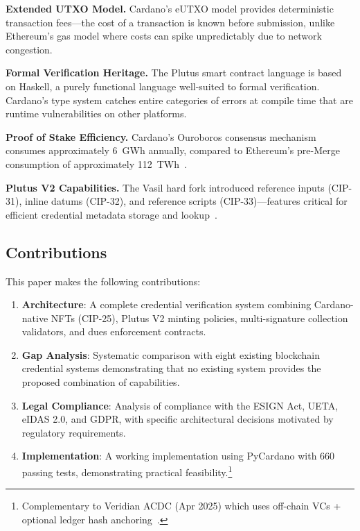 \documentclass[conference,10pt]{IEEEtran}
\begin{document}
\textbf{Extended UTXO Model.} Cardano's eUTXO model provides deterministic transaction fees---the cost of a transaction is known before submission, unlike Ethereum's gas model where costs can spike unpredictably due to network congestion.

\textbf{Formal Verification Heritage.} The Plutus smart contract language is based on Haskell, a purely functional language well-suited to formal verification. Cardano's type system catches entire categories of errors at compile time that are runtime vulnerabilities on other platforms.

\textbf{Proof of Stake Efficiency.} Cardano's Ouroboros consensus mechanism consumes approximately 6~GWh annually, compared to Ethereum's pre-Merge consumption of approximately 112~TWh~\cite{kiayias2017}.

\textbf{Plutus V2 Capabilities.} The Vasil hard fork introduced reference inputs (CIP-31), inline datums (CIP-32), and reference scripts (CIP-33)---features critical for efficient credential metadata storage and lookup~\cite{cip31,cip32,cip33}.

\subsection{Contributions}

This paper makes the following contributions:
\begin{enumerate}[leftmargin=*,nosep]
  \item \textbf{Architecture}: A complete credential verification system combining Cardano-native NFTs (CIP-25), Plutus V2 minting policies, multi-signature collection validators, and dues enforcement contracts.
  \item \textbf{Gap Analysis}: Systematic comparison with eight existing blockchain credential systems demonstrating that no existing system provides the proposed combination of capabilities.
  \item \textbf{Legal Compliance}: Analysis of compliance with the ESIGN Act, UETA, eIDAS 2.0, and GDPR, with specific architectural decisions motivated by regulatory requirements.
  \item \textbf{Implementation}: A working implementation using PyCardano with 660 passing tests, demonstrating practical feasibility.\footnote{Complementary to Veridian ACDC (Apr 2025) which uses off-chain VCs + optional ledger hash anchoring~\cite{veridian2025}.}
\end{enumerate}
\end{document}
